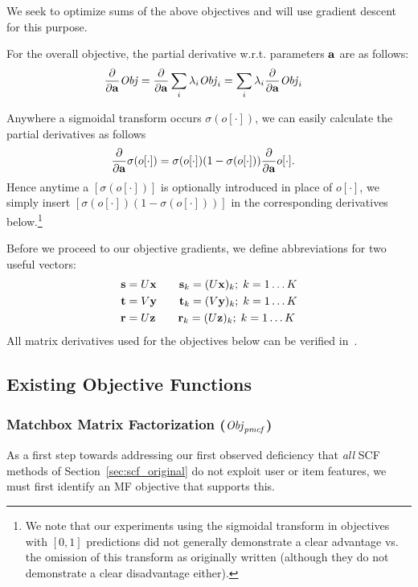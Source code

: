 We seek to optimize sums of the above objectives and will use
gradient descent for this purpose.  

For the overall objective, the partial derivative 
w.r.t. parameters $\mathbf{a}$ are as follows:
\begin{align}
\frac{\partial}{\partial \mathbf{a}} \mathit{Obj} & = \frac{\partial}{\partial \mathbf{a}} \sum_i \lambda_i \mathit{Obj}_i = \sum_i \lambda_i \frac{\partial}{\partial \mathbf{a}} \mathit{Obj}_i \label{eq:sum_der}
\end{align}

Anywhere a sigmoidal transform occurs $\sigma(o[\cdot])$, we
can easily calculate the partial derivatives as follows
\begin{align}
 \frac{\partial}{\partial \mathbf{a}}\sigma(o[\cdot]) & = \sigma(o[\cdot]) (1 - \sigma(o[\cdot])) \frac{\partial}{\partial \mathbf{a}} o[\cdot] .
\end{align}
Hence anytime a $[\sigma(o[\cdot])]$ is optionally introduced in place
of $o[\cdot]$, we simply insert $[\sigma(o[\cdot]) (1 -
\sigma(o[\cdot]))]$ in the corresponding derivatives
below.\footnote{We note that our experiments using the sigmoidal
transform in objectives with $[0,1]$ predictions did not generally
demonstrate a clear advantage vs. the omission of this transform as
originally written (although they do not demonstrate a clear
disadvantage either).}

Before we proceed to our objective gradients, we define abbreviations
for two useful vectors:
\begin{align*}
\mathbf{s} & = U \mathbf{x} \qquad \mathbf{s}_{k} = (U \mathbf{x})_{k}; \; k=1\ldots K\\
\mathbf{t} & = V \mathbf{y} \qquad \mathbf{t}_{k} = (V \mathbf{y})_{k}; \; k=1\ldots K\\
\mathbf{r} & = U \mathbf{z} \qquad \mathbf{r}_{k} = (U \mathbf{z})_{k}; \; k=1\ldots K
\end{align*}
All matrix derivatives used for the objectives below can be
verified in~\cite{matrix}.

\subsection{Existing Objective Functions}

\subsubsection{Matchbox Matrix Factorization ($\mathit{Obj}_{\mathit{pmcf}} $)}

As a first step towards
addressing our first observed deficiency that \emph{all} 
SCF methods of Section~\ref{sec:scf_original} do not exploit user
or item features, we must first identify an MF objective that
supports this.  

